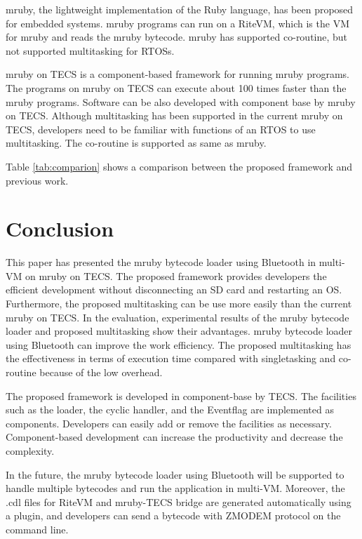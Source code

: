 \documentclass[conference,compsoc]{IEEEtran}
\begin{document}
mruby, the lightweight implementation of the Ruby language, has been proposed for embedded systems.
mruby programs can run on a RiteVM, which is the VM for mruby and reads the mruby bytecode.
mruby has supported co-routine, but not supported multitasking for RTOSs.

mruby on TECS is a component-based framework for running mruby programs.
The programs on mruby on TECS can execute about 100 times faster than the mruby programs.
Software can be also developed with component base by mruby on TECS.
Although multitasking has been supported in the current mruby on TECS, developers need to be familiar with functions of an RTOS to use multitasking.
The co-routine is supported as same as mruby.

Table \ref{tab:comparion} shows a comparison between the proposed framework and previous work.
 
\section{Conclusion}
\label{sec:Conclusion}
This paper has presented the mruby bytecode loader using Bluetooth in multi-VM on mruby on TECS.
The proposed framework provides developers the efficient development without disconnecting an SD card and restarting an OS.
Furthermore, the proposed multitasking can be use more easily than the current mruby on TECS.
In the evaluation, experimental results of the mruby bytecode loader and proposed multitasking show their advantages.
mruby bytecode loader using Bluetooth can improve the work efficiency.
The proposed multitasking has the effectiveness in terms of execution time compared with singletasking and co-routine because of the low overhead.

The proposed framework is developed in component-base by TECS.
The facilities such as the loader, the cyclic handler, and the Eventflag are implemented as components.
Developers can easily add or remove the facilities as necessary.
Component-based development can increase the productivity and decrease the complexity.

In the future, the mruby bytecode loader using Bluetooth will be supported to handle multiple bytecodes and run the application in multi-VM.
Moreover, the .cdl files for RiteVM and mruby-TECS bridge are generated automatically using a plugin, and developers can send a bytecode with ZMODEM protocol on the command line.

\end{document}
